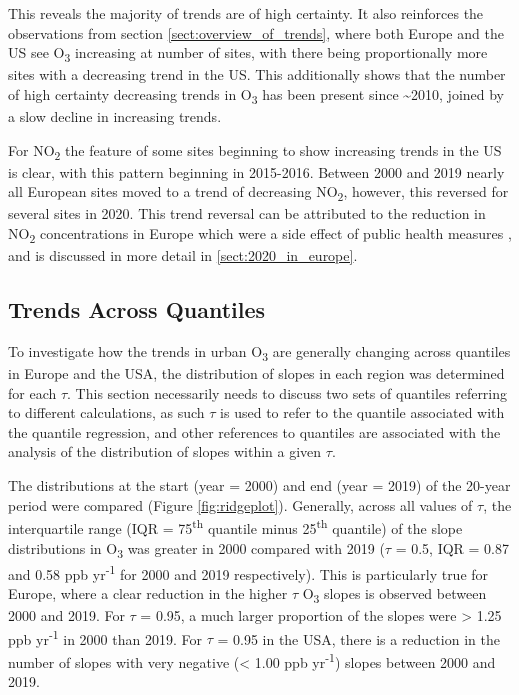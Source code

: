 \documentclass[journal abbreviation, manuscript]{copernicus}
\begin{document}
This reveals the majority of trends are of high certainty. It also reinforces the observations from section \ref{sect:overview_of_trends}, where both Europe and the US see O\textsubscript{3} increasing at number of sites, with there being proportionally more sites with a decreasing trend in the US. This additionally shows that the number of high certainty decreasing trends in O\textsubscript{3} has been present since \textasciitilde{2010}, joined by a slow decline in increasing trends. 

For NO\textsubscript{2} the feature of some sites beginning to show increasing trends in the US is clear, with this pattern beginning in 2015-2016. Between 2000 and 2019 nearly all European sites moved to a trend of decreasing NO\textsubscript{2}, however, this reversed for several sites in 2020. This trend reversal can be attributed to the reduction in NO\textsubscript{2} concentrations in Europe which were a side effect of public health measures \citep{acp-20-15743-2020, acp-21-4169-2021}, and is discussed in more detail in \ref{sect:2020_in_europe}.  

\subsection{Trends Across Quantiles} \label{sect:trends_across_quantiles}

To investigate how the trends in urban O\textsubscript{3} are generally changing across quantiles in Europe and the USA, the distribution of slopes in each region was determined for each $\tau$. This section necessarily needs to discuss two sets of quantiles referring to different calculations, as such $\tau$ is used to refer to the quantile associated with the quantile regression, and other references to quantiles are associated with the analysis of the distribution of slopes within a given $\tau$.

The distributions at the start (year = 2000) and end (year = 2019) of the 20-year period were compared (Figure \ref{fig:ridgeplot}). Generally, across all values of $\tau$, the interquartile range (IQR = 75\textsuperscript{th} quantile minus 25\textsuperscript{th} quantile) of the slope distributions in O\textsubscript{3} was greater in 2000 compared with 2019 ($\tau$ = 0.5, IQR = 0.87 and 0.58 ppb yr\textsuperscript{-1} for 2000 and 2019 respectively). This is particularly true for Europe, where a clear reduction in the higher $\tau$ O\textsubscript{3} slopes is observed between 2000 and 2019. For $\tau$ = 0.95, a much larger proportion of the slopes were > 1.25 ppb yr\textsuperscript{-1} in 2000 than 2019. For $\tau$ = 0.95 in the USA, there is a reduction in the number of slopes with very negative (< 1.00 ppb yr\textsuperscript{-1}) slopes between 2000 and 2019.
\end{document}
